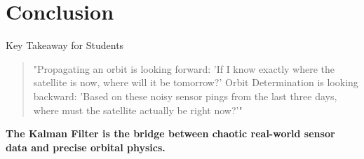 \documentclass{beamer}
\begin{document}
\section{Conclusion}

\begin{frame}{Key Takeaway for Students}
    \begin{quote}
        "Propagating an orbit is looking forward: 'If I know exactly where the satellite is now, where will it be tomorrow?' Orbit Determination is looking backward: 'Based on these noisy sensor pings from the last three days, where must the satellite actually be right now?'"
    \end{quote}
    
    \vspace{0.5cm}
    \centering \textbf{The Kalman Filter is the bridge between chaotic real-world sensor data and precise orbital physics.}
\end{frame}
\end{document}
